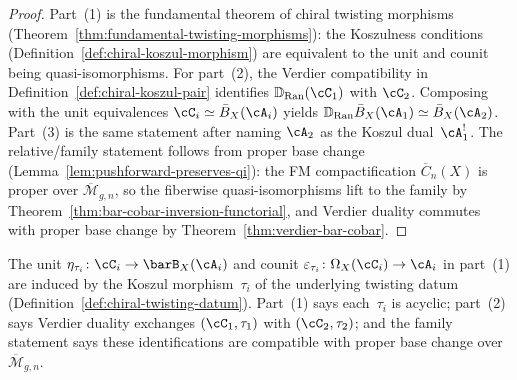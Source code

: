 \begin{proof}
Part~(1) is the fundamental theorem of chiral twisting morphisms
(Theorem~\ref{thm:fundamental-twisting-morphisms}): the Koszulness
conditions
(Definition~\ref{def:chiral-koszul-morphism}) are equivalent to
the unit and counit being quasi-isomorphisms.
For part~(2), the Verdier compatibility in
Definition~\ref{def:chiral-koszul-pair} identifies
$\mathbb{D}_{\operatorname{Ran}}(\cC_1)$ with $\cC_2$.
Composing with the unit equivalences $\cC_i \simeq \bar{B}_X(\cA_i)$
yields $\mathbb{D}_{\operatorname{Ran}} \bar{B}_X(\cA_1) \simeq
\bar{B}_X(\cA_2)$.
Part~(3) is the same statement after naming $\cA_2$ as the Koszul
dual~$\cA_1^!$.
The relative/family statement follows from proper base change
(Lemma~\ref{lem:pushforward-preserves-qi}): the FM compactification
$\overline{C}_n(X)$ is proper over $\overline{\mathcal{M}}_{g,n}$,
so the fiberwise quasi-isomorphisms lift to the family by
Theorem~\ref{thm:bar-cobar-inversion-functorial}, and Verdier
duality commutes with proper base change by
Theorem~\ref{thm:verdier-bar-cobar}.
\end{proof}

\begin{remark}
\label{rem:theorem-a-tau}
The unit $\eta_{\tau_i} \colon \cC_i \to \barB_X(\cA_i)$ and
counit $\varepsilon_{\tau_i} \colon \Omega_X(\cC_i) \to \cA_i$
in part~(1) are induced by the Koszul morphism~$\tau_i$
of the underlying twisting datum
(Definition~\ref{def:chiral-twisting-datum}).
Part~(1) says each~$\tau_i$ is acyclic;
part~(2) says Verdier duality exchanges
$(\cC_1, \tau_1)$ with $(\cC_2, \tau_2)$;
and the family statement says these identifications are
compatible with proper base change over
$\overline{\mathcal{M}}_{g,n}$.
\end{remark}

